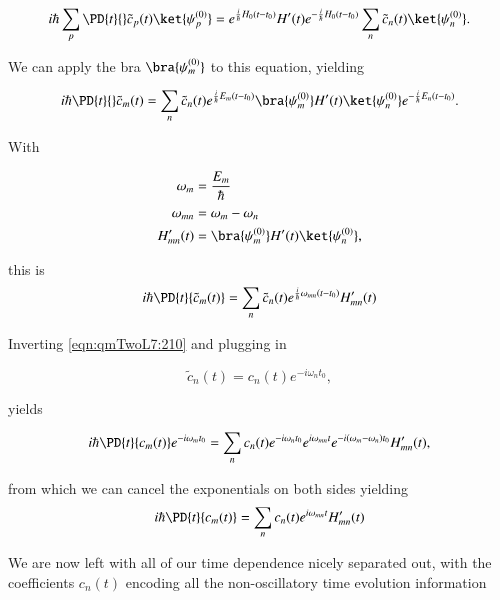 \begin{equation}\label{eqn:qmTwoL7:250}
i \hbar \sum_p \PD{t}{}
\tilde{c}_p(t) \ket{\psi_p^{(0)} }
=
e^{\frac{i}{\hbar} H_0(t - t_0)} H'(t) e^{-\frac{i}{\hbar} H_0(t - t_0)}
\sum_n
\tilde{c}_n(t) \ket{\psi_n^{(0)} }.
\end{equation}

We can apply the bra $\bra{\psi_m^{(0)}}$ to this equation, yielding

\begin{equation}\label{eqn:qmTwoL7:270}
i \hbar \PD{t}{}
\tilde{c}_m(t)
=
\sum_n
\tilde{c}_n(t)
e^{\frac{i}{\hbar} E_m(t - t_0)}
\bra{\psi_m^{(0)}} H'(t)
\ket{\psi_n^{(0)} }
e^{-\frac{i}{\hbar} E_n(t - t_0)}.
\end{equation}

With

\begin{align}\label{eqn:qmTwoL7:290}
\omega_m &= \frac{E_m}{\hbar} \\
\omega_{mn} &= \omega_m - \omega_n \\
H_{mn}'(t) &= \bra{\psi_m^{(0)}} H'(t) \ket{\psi_n^{(0)} },
\end{align}

this is
\begin{equation}\label{eqn:qmTwoL7:310}
i \hbar \PD{t}{
\tilde{c}_m(t) }
=
\sum_n
\tilde{c}_n(t)
e^{\frac{i}{\hbar} \omega_{mn}(t - t_0)}
H_{mn}'(t)
\end{equation}

Inverting \ref{eqn:qmTwoL7:210} and plugging in

\begin{equation}\label{eqn:qmTwoL7:330}
\tilde{c}_n(t) = c_n(t) e^{-i \omega_n t_0},
\end{equation}

yields

\begin{equation}\label{eqn:qmTwoL7:350}
i \hbar \PD{t}{
c_m(t)
}
e^{-i \omega_m t_0}
=
\sum_n
c_n(t) e^{-i \omega_n t_0}
e^{i\omega_{mn}t}
e^{-i(\omega_m -\omega_n) t_0}
H_{mn}'(t),
\end{equation}

from which we can cancel the exponentials on both sides yielding
\begin{equation}\label{eqn:qmTwoL7:370}
i \hbar \PD{t}{
c_m(t)
}
=
\sum_n
c_n(t)
e^{i\omega_{mn}t}
H_{mn}'(t)
\end{equation}

We are now left with all of our time dependence nicely separated out, with the coefficients $c_n(t)$ encoding all the non-oscillatory time evolution information

